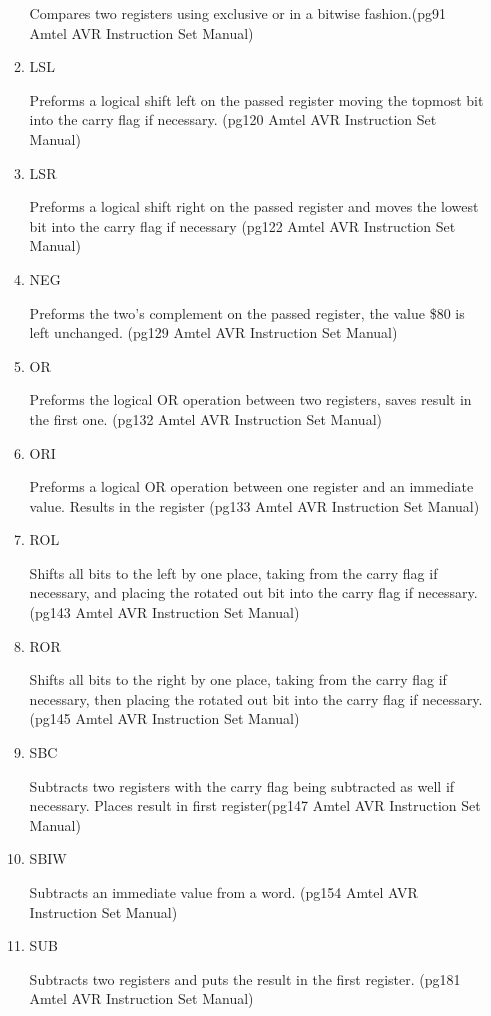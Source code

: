 \documentclass[12pt,letterpaper]{article}
\begin{document}
\begin{enumerate}
\begin{enumerate}
		Compares two registers using exclusive or in a bitwise fashion.(pg91 Amtel AVR Instruction Set Manual)
		\item LSL
		
		Preforms a logical shift left on the passed register moving the topmost bit into the carry flag if necessary. (pg120 Amtel AVR Instruction Set Manual)
		\item LSR
		
		Preforms a logical shift right on the passed register and moves the lowest bit into the carry flag if necessary (pg122 Amtel AVR Instruction Set Manual)
		\item NEG
		
		Preforms the two's complement on the passed register, the value \$80 is left unchanged. (pg129 Amtel AVR Instruction Set Manual)
		\item OR
		
		Preforms the logical OR operation between two registers, saves result in the first one. (pg132 Amtel AVR Instruction Set Manual)
		\item ORI
		
		Preforms a logical OR operation between one register and an immediate value. Results in the register (pg133 Amtel AVR Instruction Set Manual)
		\item ROL
		
		Shifts all bits to the left by one place, taking from the carry flag if necessary, and placing the rotated out bit into the carry flag if necessary. (pg143 Amtel AVR Instruction Set Manual)
		\item ROR
		
		Shifts all bits to the right by one place, taking from the carry flag if necessary, then placing the rotated out bit into the carry flag if necessary. (pg145 Amtel AVR Instruction Set Manual)
		\item SBC
		
		Subtracts two registers with the carry flag being subtracted as well if necessary. Places result in first register(pg147 Amtel AVR Instruction Set Manual)
		\item SBIW
		
		Subtracts an immediate value from a word. (pg154 Amtel AVR Instruction Set Manual)
		\item SUB
		
		Subtracts two registers and puts the result in the first register. (pg181 Amtel AVR Instruction Set Manual)
		

\end{enumerate}
\end{enumerate}
\end{document}
